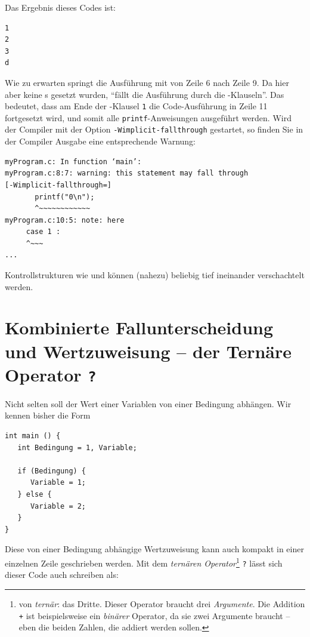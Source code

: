 Das Ergebnis dieses Codes ist:
\begin{cmdbox}
\begin{verbatim}
1
2
3
d
\end{verbatim}
\end{cmdbox}

Wie zu erwarten springt die Ausführung mit  von Zeile 6 nach Zeile 9. Da hier aber keine s gesetzt wurden, \enquote{fällt die Ausführung durch die -Klauseln}. Das bedeutet, dass am Ende der -Klausel \texttt{1} die Code-Ausführung in Zeile 11 fortgesetzt wird, und somit alle \texttt{printf}-Anweisungen ausgeführt werden. Wird der Compiler mit der Option \texttt{-Wimplicit-fallthrough} gestartet, so finden Sie in der Compiler Ausgabe eine entsprechende Warnung:

\begin{cmdbox}
\begin{verbatim}
myProgram.c: In function ‘main’:
myProgram.c:8:7: warning: this statement may fall through
[-Wimplicit-fallthrough=]
       printf("0\n");
       ^~~~~~~~~~~~~
myProgram.c:10:5: note: here
     case 1 :
     ^~~~
...
\end{verbatim}
\end{cmdbox}

Kontrollstrukturen wie  und  können (nahezu) beliebig tief ineinander verschachtelt werden.

\section{Kombinierte Fallunterscheidung und Wertzuweisung -- der Ternäre Operator \texttt{?}}
Nicht selten soll der Wert einer Variablen von einer Bedingung abhängen. Wir kennen bisher die Form

\begin{codebox}
\begin{verbatim}
int main () {
   int Bedingung = 1, Variable;

   if (Bedingung) {
      Variable = 1;
   } else {
      Variable = 2;
   }
}
\end{verbatim}
\end{codebox}

Diese von einer Bedingung abhängige Wertzuweisung kann auch kompakt in einer einzelnen Zeile geschrieben werden. Mit dem \emph{ternären Operator}\footnote{von \emph{ternär}: das Dritte. Dieser Operator braucht drei \emph{Argumente}. Die Addition \texttt{+} ist beispielsweise ein \emph{binärer} Operator, da sie zwei Argumente braucht -- eben die beiden Zahlen, die addiert werden sollen.} \texttt{?} lässt sich dieser Code auch schreiben als:

